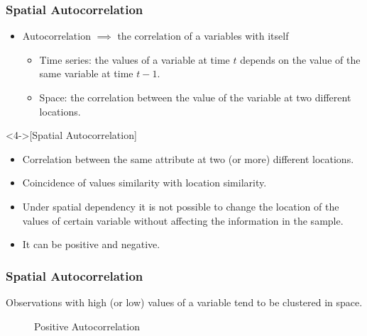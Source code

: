 \documentclass[english,10pt]{beamer}\usepackage[]{graphicx}\usepackage[]{xcolor}
\begin{document}
\begin{frame}
  \frametitle{Spatial Autocorrelation}
    \begin{itemize}
      \item <1-> Autocorrelation $\implies$ the correlation of a variables with itself
        \begin{itemize}
          \item<2-> Time series: the values of a variable at time $t$ depends on the value of the same variable at time $t-1$.
          \item<3-> Space: the correlation between the value of the variable at two different locations.
        \end{itemize}
    \end{itemize}



  \begin{definition}<4->[Spatial Autocorrelation]
    \begin{itemize}
      \item Correlation between the same attribute at two (or more) different locations.
      \item Coincidence of values similarity with location similarity.
      \item Under spatial dependency it is not possible to change the location of the values of certain variable without affecting the information in the sample. 
      \item It can be positive and negative.
    \end{itemize}
  \end{definition}
\end{frame}

\begin{frame}
  \frametitle{Spatial Autocorrelation}
    \begin{definition}
    Observations with high (or low) values of a variable tend to be clustered in space.
    \end{definition}

\pause    
\begin{figure}[h]
\caption{Positive Autocorrelation}
\centering
{}
\end{figure}
\end{frame}
\end{document}
